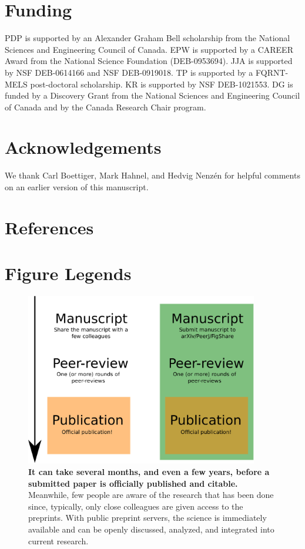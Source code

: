 \documentclass[10pt]{article}
\begin{document}
\section*{Funding}

PDP is supported by an Alexander Graham Bell scholarship from the National
Sciences and Engineering Council of Canada. EPW is supported by a CAREER Award
from the National Science Foundation (DEB-0953694). JJA is supported by NSF
DEB-0614166 and NSF DEB-0919018.  TP is supported by a FQRNT-MELS post-doctoral
scholarship. KR is supported by NSF DEB-1021553. DG is funded by a Discovery
Grant from the National Sciences and Engineering Council of Canada and by the
Canada Research Chair program.

\section*{Acknowledgements}

We thank Carl Boettiger, Mark Hahnel, and Hedvig Nenz\'en for helpful comments
on an earlier version of this manuscript.

\section*{References}


\newpage
\section*{Figure Legends}

\begin{figure}[!ht]
\begin{center}
\includegraphics[width=4in]{map.eps}
\end{center}
\caption { {\bf It can take several months, and even a few years, before a submitted
paper is officially published and citable.} Meanwhile, few people are aware of the
research that has been done since, typically, only close colleagues are given
access to the preprints. With public preprint servers, the science is
immediately available and can be openly discussed, analyzed, and integrated into
current research. }
\label{fig:map}
\end{figure}
\end{document}
